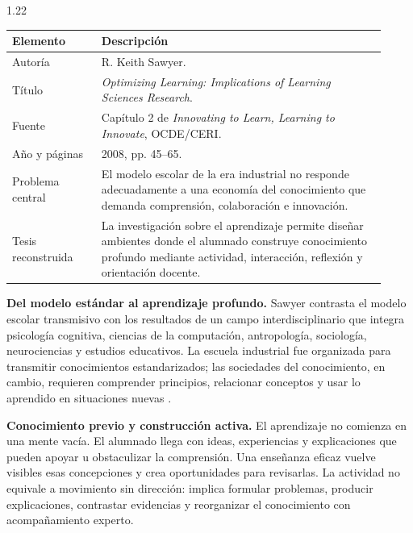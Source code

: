 \documentclass[spanish,letterpaper,oneside]{article}
\begin{document}
\begin{reportelecturabox}[title={Reporte de lectura 2: R. Keith Sawyer}]
\begin{spacing}{1.22}
\begin{fichalecturabox}
\begin{tabular}{@{}p{0.22\linewidth}p{0.70\linewidth}@{}}
\toprule
\textbf{Elemento} & \textbf{Descripción} \\
\midrule
Autoría & R. Keith Sawyer. \\
Título & \textit{Optimizing Learning: Implications of Learning Sciences Research}. \\
Fuente & Capítulo 2 de \textit{Innovating to Learn, Learning to Innovate}, OCDE/CERI. \\
Año y páginas & 2008, pp. 45--65. \\
Problema central & El modelo escolar de la era industrial no responde adecuadamente a una economía del conocimiento que demanda comprensión, colaboración e innovación. \\
Tesis reconstruida & La investigación sobre el aprendizaje permite diseñar ambientes donde el alumnado construye conocimiento profundo mediante actividad, interacción, reflexión y orientación docente. \\
\bottomrule
\end{tabular}
\end{fichalecturabox}

\noindent\textbf{Del modelo estándar al aprendizaje profundo.}\enspace
Sawyer contrasta el modelo escolar transmisivo con los resultados de un campo interdisciplinario que integra psicología cognitiva, ciencias de la computación, antropología, sociología, neurociencias y estudios educativos. La escuela industrial fue organizada para transmitir conocimientos estandarizados; las sociedades del conocimiento, en cambio, requieren comprender principios, relacionar conceptos y usar lo aprendido en situaciones nuevas \citep{sawyer2008optimizing}.

\medskip\noindent\textbf{Conocimiento previo y construcción activa.}\enspace
El aprendizaje no comienza en una mente vacía. El alumnado llega con ideas, experiencias y explicaciones que pueden apoyar u obstaculizar la comprensión. Una enseñanza eficaz vuelve visibles esas concepciones y crea oportunidades para revisarlas. La actividad no equivale a movimiento sin dirección: implica formular problemas, producir explicaciones, contrastar evidencias y reorganizar el conocimiento con acompañamiento experto.


\end{spacing}
\end{reportelecturabox}
\end{document}
